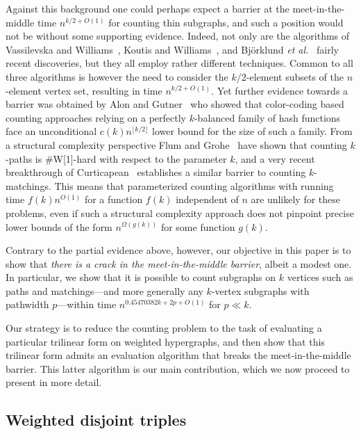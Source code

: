 \documentclass{amsart}
\begin{document}
Against this background one could perhaps expect a barrier 
at the meet-in-the-middle time $n^{k/2+O(1)}$ for counting
thin subgraphs, and such a position would not be without some supporting 
evidence. Indeed, not only are the algorithms of Vassilevska and 
Williams~\cite{VW09}, Koutis and Williams~\cite{KW09}, and Bj\"orklund \emph{et al.}~\cite{BHKK09} fairly recent discoveries, but they all employ 
rather different techniques. Common to all three algorithms is however 
the need to consider the $k/2$-element subsets of the $n$-element vertex set, 
resulting in time $n^{k/2+O(1)}$. Yet further evidence towards a barrier 
was obtained by Alon and Gutner~\cite{AG09} who showed that 
color-coding based counting approaches relying on 
a perfectly $k$-balanced family of hash functions face 
an unconditional $c(k)n^{\lfloor k/2\rfloor}$ lower bound for the size 
of such a family. From a structural complexity perspective 
Flum and Grohe~\cite{FG04} have shown that counting $k$-paths is \#W[1]-hard 
with respect to the parameter $k$, and a very recent breakthrough of 
Curticapean~\cite{C13} establishes a similar barrier to counting $k$-matchings.
This means that parameterized counting algorithms with running time $f(k)n^{O(1)}$ 
for a function $f(k)$ independent of $n$ are unlikely for these problems,
even if such a structural complexity approach does not pinpoint precise
lower bounds of the form $n^{\Omega(g(k))}$ for some function $g(k)$. 

Contrary to the partial evidence above, however, our objective
in this paper is to show that 
{\em there is a crack in the meet-in-the-middle barrier}, 
albeit a modest one. In particular, we show that it is possible 
to count subgraphs on $k$ vertices such as paths and matchings---and more 
generally any $k$-vertex subgraphs with pathwidth $p$---within 
time $n^{0.45470382k+2p+O(1)}$ for $p\ll k$.

Our strategy is to reduce the counting problem to the task of 
evaluating a particular trilinear form on weighted hypergraphs, and 
then show that this trilinear form admits an evaluation algorithm that breaks 
the meet-in-the-middle barrier. This latter algorithm is our main contribution,
which we now proceed to present in more detail.

\subsection{Weighted disjoint triples}
\end{document}
